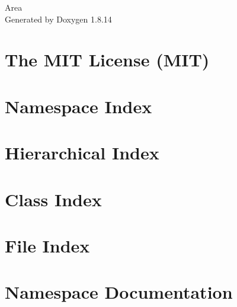 \documentclass[twoside]{book}
\newcommand{\+}{\discretionary{\mbox{\scriptsize$\hookleftarrow$}}{}{}}
\newcommand{\clearemptydoublepage}{%
  \newpage{\pagestyle{empty}\cleardoublepage}%
}
\begin{document}
\hypersetup{pageanchor=false,
             bookmarksnumbered=true,
             pdfencoding=unicode
            }
\begin{titlepage}
\vspace*{7cm}
\begin{center}%
{\Large Area }\\
\vspace*{1cm}
{\large Generated by Doxygen 1.8.14}\\
\end{center}
\end{titlepage}
\clearemptydoublepage
{}
\tableofcontents
\clearemptydoublepage
{}
\hypersetup{pageanchor=true}

\chapter{The M\+IT License (M\+IT)}
\label{md_wwwroot_lib_jquery-validation_LICENSE}

\chapter{Namespace Index}

\chapter{Hierarchical Index}

\chapter{Class Index}

\chapter{File Index}

\chapter{Namespace Documentation}




\end{document}
